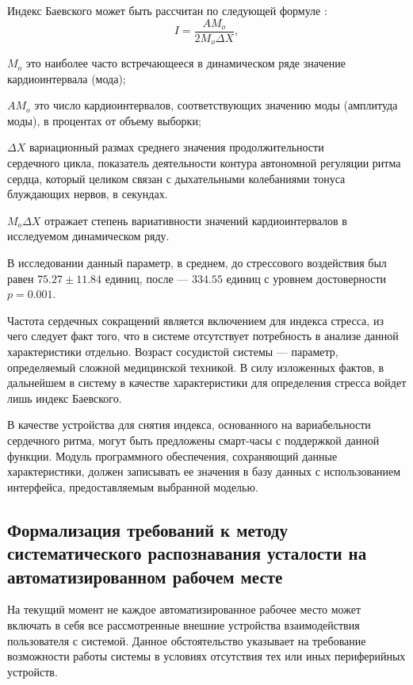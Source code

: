 Индекс Баевского может быть рассчитан по следующей формуле \cite{baevskiy}:
\begin{equation}
\label{eq:baevskiy}
I = \frac{AM_o}{2 M_o \Delta X},
\end{equation}
\begin{eqexpl}[15mm]
\item{$M_o$} это наиболее часто встречающееся в динамическом ряде значение кардиоинтервала (мода);
\item{$AM_o$} это число кардиоинтервалов, соответствующих значению моды (амплитуда моды), в процентах от объему выборки;
\item{$\Delta X$} вариационный размах среднего значения продолжительности\\сердечного цикла, показатель деятельности контура автономной регуляции ритма сердца, который целиком связан с дыхательными колебаниями тонуса блуждающих нервов, в секундах.
\item{$M_o \Delta X$} отражает степень вариативности значений кардиоинтервалов в исследуемом динамическом ряду.
\end{eqexpl}

В исследовании данный параметр, в среднем, до стрессового воздействия был равен $75.27 \pm 11.84$ единиц, после --- $334.55$ единиц с уровнем достоверности $p = 0.001$.

Частота сердечных сокращений является включением для индекса стресса, из чего следует факт того, что в системе отсутствует потребность в анализе данной характеристики отдельно. Возраст сосудистой системы --- параметр, определяемый сложной медицинской техникой. В силу изложенных фактов, в дальнейшем в систему в качестве характеристики для определения стресса войдет лишь индекс Баевского.

В качестве устройства для снятия индекса, основанного на вариабельности сердечного ритма, могут быть предложены смарт-часы с поддержкой данной функции. Модуль программного обеспечения, сохраняющий данные характеристики, должен записывать ее значения в базу данных с использованием интерфейса, предоставляемым выбранной моделью.


\subsection{Формализация требований к методу систематического распознавания усталости на автоматизированном рабочем месте}
На текущий момент не каждое автоматизированное рабочее место может включать в себя все рассмотренные внешние устройства взаимодействия пользователя с системой. Данное обстоятельство указывает на требование возможности работы системы в условиях отсутствия тех или иных периферийных устройств.

